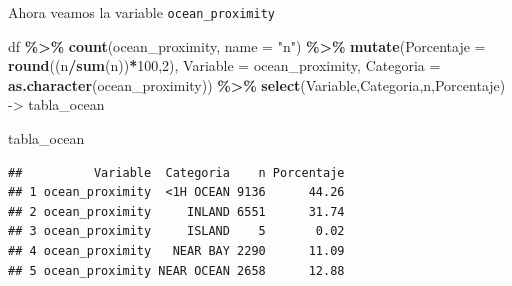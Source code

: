 \documentclass[
]{book}
\newenvironment{Shaded}{\begin{snugshade}}{\end{snugshade}}
\newcommand{\AttributeTok}[1]{\textcolor[rgb]{0.13,0.29,0.53}{#1}}
\newcommand{\DecValTok}[1]{\textcolor[rgb]{0.00,0.00,0.81}{#1}}
\newcommand{\FunctionTok}[1]{\textcolor[rgb]{0.13,0.29,0.53}{\textbf{#1}}}
\newcommand{\NormalTok}[1]{#1}
\newcommand{\OtherTok}[1]{\textcolor[rgb]{0.56,0.35,0.01}{#1}}
\newcommand{\SpecialCharTok}[1]{\textcolor[rgb]{0.81,0.36,0.00}{\textbf{#1}}}
\newcommand{\StringTok}[1]{\textcolor[rgb]{0.31,0.60,0.02}{#1}}
\begin{document}
Ahora veamos la variable \texttt{ocean\_proximity}

\begin{Shaded}
\begin{Highlighting}[]
\NormalTok{df }\SpecialCharTok{\%\textgreater{}\%}
  \FunctionTok{count}\NormalTok{(ocean\_proximity, }\AttributeTok{name =} \StringTok{"n"}\NormalTok{) }\SpecialCharTok{\%\textgreater{}\%}
  \FunctionTok{mutate}\NormalTok{(}\AttributeTok{Porcentaje =} \FunctionTok{round}\NormalTok{((n}\SpecialCharTok{/}\FunctionTok{sum}\NormalTok{(n))}\SpecialCharTok{*}\DecValTok{100}\NormalTok{,}\DecValTok{2}\NormalTok{),}
         \AttributeTok{Variable =} \StringTok{\textquotesingle{}ocean\_proximity\textquotesingle{}}\NormalTok{,}
         \AttributeTok{Categoria =} \FunctionTok{as.character}\NormalTok{(ocean\_proximity)) }\SpecialCharTok{\%\textgreater{}\%} \FunctionTok{select}\NormalTok{(Variable,Categoria,n,Porcentaje) }\OtherTok{{-}\textgreater{}}\NormalTok{ tabla\_ocean}

\NormalTok{tabla\_ocean}
\end{Highlighting}
\end{Shaded}

\begin{verbatim}
##          Variable  Categoria    n Porcentaje
## 1 ocean_proximity  <1H OCEAN 9136      44.26
## 2 ocean_proximity     INLAND 6551      31.74
## 3 ocean_proximity     ISLAND    5       0.02
## 4 ocean_proximity   NEAR BAY 2290      11.09
## 5 ocean_proximity NEAR OCEAN 2658      12.88
\end{verbatim}
\end{document}
